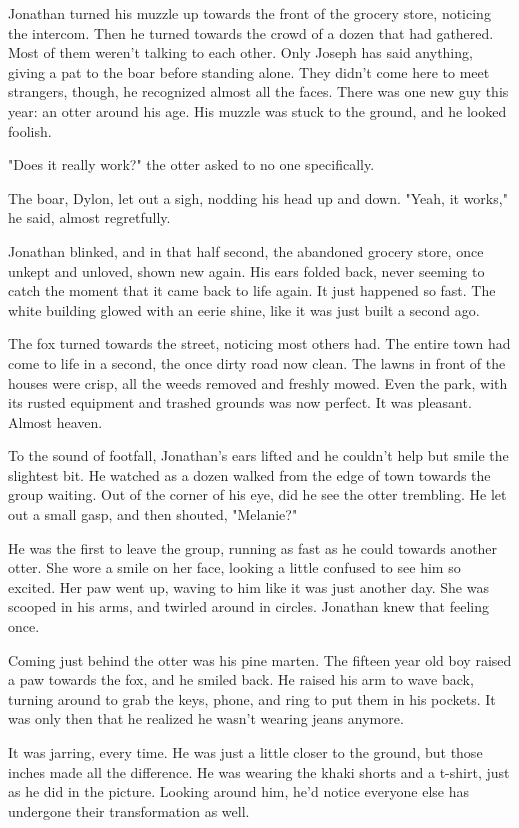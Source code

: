 Jonathan turned his muzzle up towards the front of the grocery store, noticing the intercom. Then he turned towards the crowd of a dozen that had gathered. Most of them weren't talking to each other. Only Joseph has said anything, giving a pat to the boar before standing alone. They didn't come here to meet strangers, though, he recognized almost all the faces. There was one new guy this year: an otter around his age. His muzzle was stuck to the ground, and he looked foolish.

"Does it really work?" the otter asked to no one specifically.

The boar, Dylon, let out a sigh, nodding his head up and down. "Yeah, it works," he said, almost regretfully.

Jonathan blinked, and in that half second, the abandoned grocery store, once unkept and unloved, shown new again. His ears folded back, never seeming to catch the moment that it came back to life again. It just happened so fast. The white building glowed with an eerie shine, like it was just built a second ago.

The fox turned towards the street, noticing most others had. The entire town had come to life in a second, the once dirty road now clean. The lawns in front of the houses were crisp, all the weeds removed and freshly mowed. Even the park, with its rusted equipment and trashed grounds was now perfect. It was pleasant. Almost heaven.

To the sound of footfall, Jonathan's ears lifted and he couldn't help but smile the slightest bit. He watched as a dozen walked from the edge of town towards the group waiting. Out of the corner of his eye, did he see the otter trembling. He let out a small gasp, and then shouted, "Melanie?"

He was the first to leave the group, running as fast as he could towards another otter. She wore a smile on her face, looking a little confused to see him so excited. Her paw went up, waving to him like it was just another day. She was scooped in his arms, and twirled around in circles. Jonathan knew that feeling once.

Coming just behind the otter was his pine marten. The fifteen year old boy raised a paw towards the fox, and he smiled back. He raised his arm to wave back, turning around to grab the keys, phone, and ring to put them in his pockets. It was only then that he realized he wasn't wearing jeans anymore.

It was jarring, every time. He was just a little closer to the ground, but those inches made all the difference. He was wearing the khaki shorts and a t-shirt, just as he did in the picture. Looking around him, he'd notice everyone else has undergone their transformation as well.

